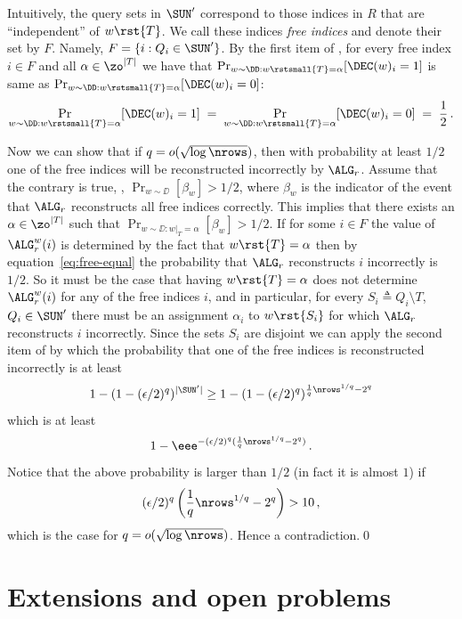 Intuitively, the query sets in $\SUN'$ correspond to those indices in $R$ that are ``independent'' of $w\rst{T}$.
We call these indices \emph{free indices} and denote their set by $F$. Namely, $F = \{i:Q_i \in \SUN'\}$.
By the first item of , for every free index $i \in F$ and all $\alpha \in \zo^{|T|}$ we have that
$\Pr_{w \sim \DD : w\rstsmall{T}=\alpha} [\DEC(w)_i = 1]$ is same as
$\Pr_{w \sim \DD : w\rstsmall{T}=\alpha} [\DEC(w)_i = 0]$:
\begin{equation}\label{eq:free-equal}
  \Pr_{w \sim \DD : w\rstsmall{T}=\alpha} [\DEC(w)_i = 1] \;=\; \Pr_{w
  \sim \DD : w\rstsmall{T}=\alpha} [\DEC(w)_i = 0] \;=\; \frac{1}{2}\,.
\end{equation}

Now we can show that if $q = o(\sqrt{\log \nrows})$, then with probability at least $1/2$ one of the free indices will be reconstructed incorrectly by $\ALG_r$.
Assume that the contrary is true, \ie, $\Pr_{w \sim \DD}[\beta_w] > 1/2$, where $\beta_w$ is the indicator of the event that $\ALG_r$ reconstructs all free indices correctly. This implies that there exists an $\alpha \in \zo^{|T|}$ such that
$\Pr_{w\sim \DD: w|_T= \alpha} [\beta_w] > 1/2$.
If for some $i\in F$ the value of $\ALG_r^w(i)$ is
determined by the fact that $w\rst{T} = \alpha$ then by equation~\eqref{eq:free-equal} the probability
that $\ALG_r$ reconstructs $i$ incorrectly is $1/2$. So it must be the
case that having $w\rst{T} = \alpha$ does not determine $\ALG_r^w(i)$
for any of the free indices $i$, and in particular, for every $S_i
\triangleq Q_i \setminus T$, $Q_i \in \SUN'$ there must be an
assignment $\alpha_i$ to $w\rst{S_i}$ for which $\ALG_r$ reconstructs
$i$ incorrectly. Since the sets $S_i$ are disjoint we can apply the
second item of  by which the probability that
one of the free indices is reconstructed incorrectly is at least $$1 -
(1-(\epsilon/2)^{q})^{|\SUN'|} \geq 1 -
(1-(\epsilon/2)^{q})^{\frac{1}{q}\nrows^{1/q} - 2^q}$$ which is at
least
\[
1 - \eee^{-(\epsilon/2)^{q} (\frac{1}{q}\nrows^{1/q} - 2^q)}\,.
\]
Notice that the above probability is larger than $1/2$ (in fact it is
almost $1$) if \[
(\epsilon/2)^{q} \left(\frac{1}{q}\nrows^{1/q}-2^q\right) > 10\,,
\]
which is the case for $q = o(\sqrt{\log \nrows})$. Hence a contradiction.\hfill\qed


\section{Extensions and open problems} \label{sec:conclusion}

